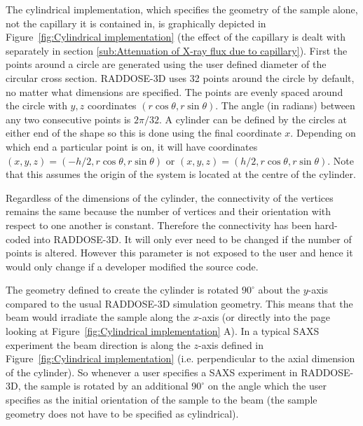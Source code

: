 The cylindrical implementation, which specifies the geometry of the sample alone, not the capillary it is contained in, is graphically depicted in Figure~\ref{fig:Cylindrical implementation} (the effect of the capillary is dealt with separately in section \ref{sub:Attenuation of X-ray flux due to capillary}).
First the points around a circle are generated using the user defined diameter of the circular cross section.
RADDOSE-3D uses 32 points around the circle by default, no matter what dimensions are specified.
The points are evenly spaced around the circle with $y, z$ coordinates $(r \cos \theta, r \sin \theta)$.
The angle (in radians) between any two consecutive points is $2 \pi / 32$.
A cylinder can be defined by the circles at either end of the shape so this is done using the final coordinate $x$.
Depending on which end a particular point is on, it will have coordinates $(x, y, z) = (-h/2, r \cos \theta, r \sin \theta)$ or $(x, y, z) = (h/2, r \cos \theta, r \sin \theta)$.
Note that this assumes the origin of the system is located at the centre of the cylinder.

Regardless of the dimensions of the cylinder, the connectivity of the vertices remains the same because the number of vertices and their orientation with respect to one another is constant.
Therefore the connectivity has been hard-coded into RADDOSE-3D.
It will only ever need to be changed if the number of points is altered.
However this parameter is not exposed to the user and hence it would only change if a developer modified the source code.

The geometry defined to create the cylinder is rotated $90^{\circ}$ about the $y$-axis compared to the usual RADDOSE-3D simulation geometry.
This means that the beam would irradiate the sample along the $x$-axis (or directly into the page looking at Figure~\ref{fig:Cylindrical implementation} A).
In a typical SAXS experiment the beam direction is along the $z$-axis defined in Figure~\ref{fig:Cylindrical implementation}  (i.e. perpendicular to the axial dimension of the cylinder).
So whenever a user specifies a SAXS experiment in RADDOSE-3D, the sample is rotated by an additional $90^{\circ}$ on the angle which the user specifies as the initial orientation of the sample to the beam (the sample geometry does not have to be specified as cylindrical).

